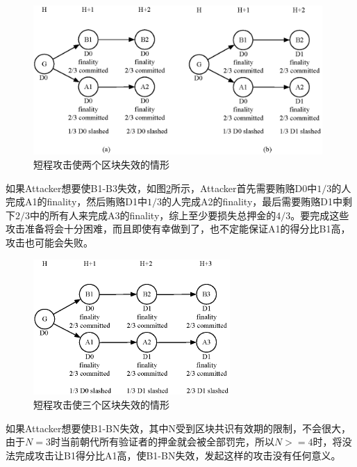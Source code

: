 \begin{figure}[h]
\centering
\includegraphics[width=11cm]{./figs/revert2}
\caption{短程攻击使两个区块失效的情形}
\label{fig:revert2}
\end{figure}


如果Attacker想要使B1-B3失效，如图\ref{fig:revert3}所示，Attacker首先需要贿赂D0中$1/3$的人完成A1的finality，然后贿赂D1中$1/3$的人完成A2的finality，最后需要贿赂D1中剩下$2/3$中的所有人来完成A3的finality，综上至少要损失总押金的$4/3$。要完成这些攻击准备将会十分困难，而且即使有幸做到了，也不定能保证A1的得分比B1高，攻击也可能会失败。

\begin{figure}[h]
\centering
\includegraphics[width=7.5cm]{./figs/revert3}
\caption{短程攻击使三个区块失效的情形}
\label{fig:revert3}
\end{figure}

如果Attacker想要使B1-BN失效，其中N受到区块共识有效期的限制，不会很大，由于$N=3$时当前朝代所有验证者的押金就会被全部罚完，所以$N>=4$时，将没法完成攻击让B1得分比A1高，使B1-BN失效，发起这样的攻击没有任何意义。
